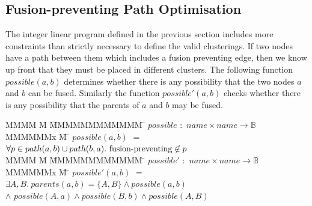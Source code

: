 \subsection{Fusion-preventing Path Optimisation}
\label{s:OptimisedConstraints}
The integer linear program defined in the previous section includes more constraints than strictly necessary to define the valid clusterings. If two nodes have a path between them which includes a fusion preventing edge, then we know up front that they must be placed in different clusters. The following function $possible(a,b)$ determines whether there is any possibility that the two nodes $a$ and $b$ can be fused. Similarly the function $possible'(a, b)$ checks whether there is any possibility that the parents of $a$ and $b$ may be fused.
%
\begin{tabbing}
MMMM \= M \=     \= MMMMMMMMMMMM    \=  \kill
$possible$ \> $:$     \> $name \times name \to \mathbb{B}$      \\
MMMMMMx        \= M    \= \kill
$possible(a,b)$   
        \> $=$  \>$\forall p \in path(a,b) \cup path(b,a).\ \fusionpreventing \not\in p$
\\[1ex]
MMMM \= M \=     \= MMMMMMMMMMMM    \=  \kill
$possible'$     \> $:$ \> $name \times name \to \mathbb{B}$      \\
MMMMMMx        \= M    \= \kill
$possible'(a,b)$ 
        \> $=$   \>$\exists A, B.\  parents(a,b) = \{A,B\} \wedge possible(a,b)$ \\
        \> $\wedge$ \> $possible(A,a) \wedge possible(B,b) \wedge possible(A,B)$
\end{tabbing}

